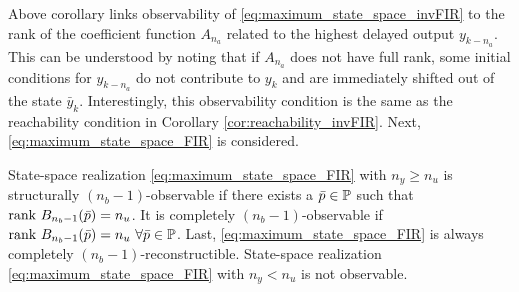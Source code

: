 Above corollary links observability of \eqref{eq:maximum_state_space_invFIR} to the rank of the coefficient function $A_{n_a}$ related to the highest delayed output $y_{k-n_a}$. This can be understood by noting that if $A_{n_a}$ does not have full rank, some initial conditions for $y_{k-n_a}$ do not contribute to $y_k$ and are immediately shifted out of the state $\bar{y}_k$. Interestingly, this observability condition is the same as the reachability condition in Corollary \eqref{cor:reachability_invFIR}. Next, \eqref{eq:maximum_state_space_FIR} is considered.

\begin{corollary}\label{cor:FIR_observability}
    State-space realization \eqref{eq:maximum_state_space_FIR} with $n_y \geq n_u$ is structurally $(n_b-1)$-observable if there exists a $\bar{p}\in\mathbb{P}$ such that $\textrm{rank}\ B_{n_b-1}(\bar{p}) = n_u$. It is completely $(n_b-1)$-observable if $\textrm{rank}\ B_{n_b-1}(\bar{p}) = n_u\ \forall \bar{p}\in\mathbb{P}$. Last, \eqref{eq:maximum_state_space_FIR} is always completely $(n_b-1)$-reconstructible. State-space realization \eqref{eq:maximum_state_space_FIR} with $n_y < n_u$ is not observable.
\end{corollary}
